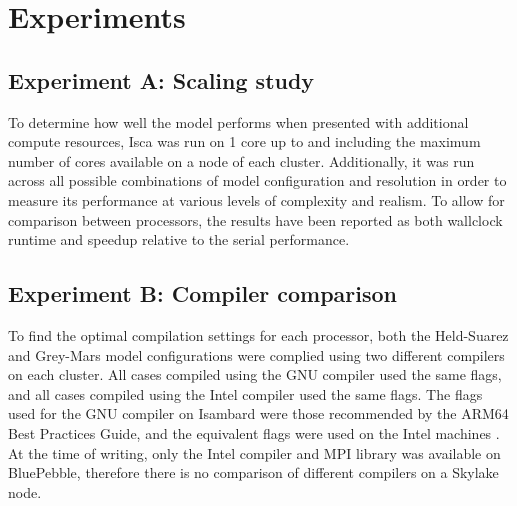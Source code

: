 \documentclass[a4paper,11pt]{report}
\begin{document}
\section{Experiments}
\label{sec:experiment-methods}
\subsection{Experiment A: Scaling study}
To determine how well the model performs when presented with additional compute resources, Isca was run on 1 core up to and including the maximum number of cores available on a node of each cluster. Additionally, it was run across all possible combinations of model configuration and resolution in order to measure its performance at various levels of complexity and realism. To allow for comparison between processors, the results have been reported as both wallclock runtime and speedup relative to the serial performance.
\par

\subsection{Experiment B: Compiler comparison}
To find the optimal compilation settings for each processor, both the Held-Suarez and Grey-Mars model configurations were complied using two different compilers on each cluster. All cases compiled using the GNU compiler used the same flags, and all cases compiled using the Intel compiler used the same flags. The flags used for the GNU compiler on Isambard were those recommended by the ARM64 Best Practices Guide, and the equivalent flags were used on the Intel machines \cite{arm2019practices}. At the time of writing, only the Intel compiler and MPI library was available on BluePebble, therefore there is no comparison of different compilers on a Skylake node. 
\par
\end{document}

